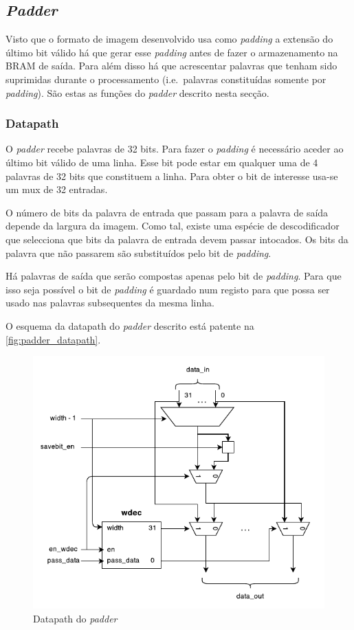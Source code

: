 \documentclass[a4paper]{article}
\begin{document}
\subsection{\textit{Padder}}
Visto que o formato de imagem desenvolvido usa como \textit{padding} a extensão do último bit válido há que gerar esse \textit{padding} antes de fazer o armazenamento na BRAM de saída. Para além disso há que acrescentar palavras que tenham sido suprimidas durante o processamento (i.e.\ palavras constituídas somente por \textit{padding}). São estas as funções do \textit{padder} descrito nesta secção.

\subsubsection{Datapath}
O \textit{padder} recebe palavras de 32 bits. Para fazer o \textit{padding} é necessário aceder ao último bit válido de uma linha. Esse bit pode estar em qualquer uma de 4 palavras de 32 bits que constituem a linha. Para obter o bit de interesse usa-se um mux de 32 entradas.

O número de bits da palavra de entrada que passam para a palavra de saída depende da largura da imagem. Como tal, existe uma espécie de descodificador que selecciona que bits da palavra de entrada devem passar intocados. Os bits da palavra que não passarem são substituídos pelo bit de \textit{padding}.

Há palavras de saída que serão compostas apenas pelo bit de \textit{padding}. Para que isso seja possível o bit de \textit{padding} é guardado num registo para que possa ser usado nas palavras subsequentes da mesma linha.

O esquema da datapath do \textit{padder} descrito está patente na \autoref{fig:padder_datapath}.

\begin{figure}[h]
	\centering
	\includegraphics[width=.8\linewidth]{padder_datapath}
	\caption{Datapath do \textit{padder}}
	\label{fig:padder_datapath}
\end{figure}
\end{document}
